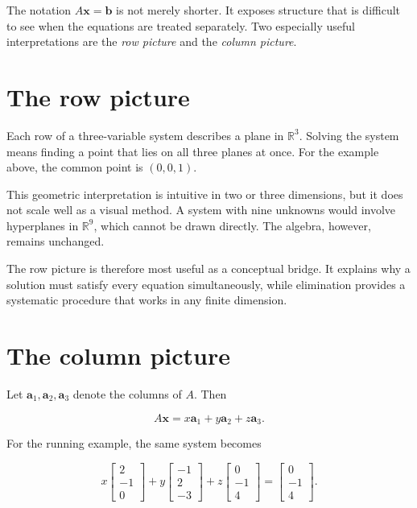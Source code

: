 \begin{remark}
The notation \(A\mathbf{x}=\mathbf{b}\) is not merely shorter. It exposes
structure that is difficult to see when the equations are treated separately.
Two especially useful interpretations are the \emph{row picture} and the
\emph{column picture}.
\end{remark}

\section{The row picture}

Each row of a three-variable system describes a plane in
\(\mathbb{R}^{3}\). Solving the system means finding a point that lies on all
three planes at once. For the example above, the common point is
\((0,0,1)\).

This geometric interpretation is intuitive in two or three dimensions, but it
does not scale well as a visual method. A system with nine unknowns would
involve hyperplanes in \(\mathbb{R}^{9}\), which cannot be drawn directly.
The algebra, however, remains unchanged.


The row picture is therefore most useful as a conceptual bridge. It explains
why a solution must satisfy every equation simultaneously, while elimination
provides a systematic procedure that works in any finite dimension.

\section{The column picture}

Let \(\mathbf{a}_1,\mathbf{a}_2,\mathbf{a}_3\) denote the columns of \(A\).
Then

\[
    A\mathbf{x}
    =x\mathbf{a}_1+y\mathbf{a}_2+z\mathbf{a}_3.
\]

For the running example, the same system becomes

\[
    x\begin{bmatrix}2\\-1\\0\end{bmatrix}
    +y\begin{bmatrix}-1\\2\\-3\end{bmatrix}
    +z\begin{bmatrix}0\\-1\\4\end{bmatrix}
    =\begin{bmatrix}0\\-1\\4\end{bmatrix}.
\]

